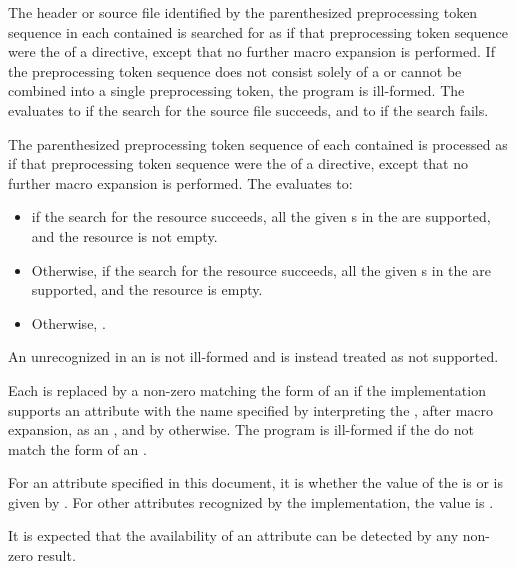 \pnum
The header or source file identified by
the parenthesized preprocessing token sequence
in each contained 
is searched for as if that preprocessing token sequence
were the  of a  directive,
except that no further macro expansion is performed.
If the preprocessing token sequence does not consist solely of a 
or cannot be combined into a single
 preprocessing token, the program is ill-formed.
The  evaluates
to  if the search for the source file succeeds, and
to  if the search fails.

\pnum
The parenthesized preprocessing token sequence of each contained
 is processed as if that
preprocessing token sequence were the 
of a  directive,
except that no further macro expansion is performed.
The  evaluates to:
\begin{itemize}
\item
{} if the search for the resource succeeds,
all the given s in the 
are supported, and the resource is not empty.
\item
Otherwise,  if the search for the resource succeeds,
all the given s in the 
are supported, and the resource is empty.
\item
Otherwise, .
\end{itemize}
\begin{note}
An unrecognized  in an 
is not ill-formed and is instead treated as not supported.
\end{note}

\pnum
Each  is replaced by
a non-zero 
matching the form of an 
if the implementation supports an attribute
with the name specified by interpreting
the , after macro expansion,
as an ,
and by  otherwise.
The program is ill-formed if the 
do not match the form of an .

\pnum
For an attribute specified in this document,
it is 
whether the value of the 
is  or is given by .
For other attributes recognized by the implementation,
the value is
.
\begin{note}
It is expected
that the availability of an attribute can be detected by any non-zero result.
\end{note}

